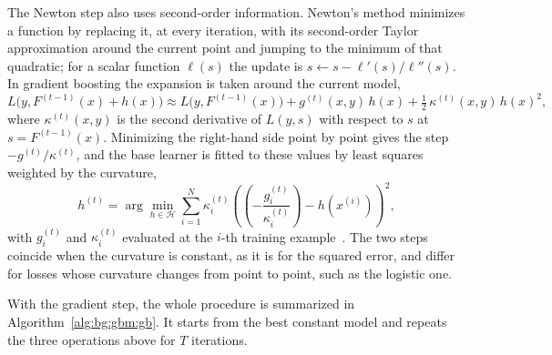     The Newton step also uses second-order information. Newton's method minimizes
    a function by replacing it, at every iteration, with its second-order Taylor
    approximation around the current point and jumping to the minimum of that
    quadratic; for a scalar function $\ell(s)$ the update is
    $s \leftarrow s - \ell'(s) / \ell''(s)$. In gradient boosting the expansion is
    taken around the current model,
    \begin{equation}
    L\bigl(y, F^{(t-1)}(x) + h(x)\bigr) \approx
    L\bigl(y, F^{(t-1)}(x)\bigr) + g^{(t)}(x, y)\, h(x)
    + \tfrac{1}{2}\, \kappa^{(t)}(x, y)\, h(x)^{2},
    \label{eq:bg:gbm:taylor}
    \end{equation}
    where $\kappa^{(t)}(x, y)$ is the second derivative of $L(y, s)$ with respect
    to $s$ at $s = F^{(t-1)}(x)$. Minimizing the right-hand side point by point
    gives the step $-g^{(t)} / \kappa^{(t)}$, and the base learner is fitted to
    these values by least squares weighted by the curvature,
    \begin{equation}
    h^{(t)} = \arg\min_{h \in \mathcal{H}}
    \sum_{i=1}^{N} \kappa_i^{(t)}
    \left( \left(-\frac{g_i^{(t)}}{\kappa_i^{(t)}}\right) - h(x^{(i)}) \right)^{2},
    \label{eq:bg:gbm:newton}
    \end{equation}
    with $g_i^{(t)}$ and $\kappa_i^{(t)}$ evaluated at the $i$-th training
    example~\cite{ibragimov2019}. The two steps coincide when the curvature is
    constant, as it is for the squared error, and differ for losses whose
    curvature changes from point to point, such as the logistic one.
    
    With the gradient step, the whole procedure is summarized in
    Algorithm~\ref{alg:bg:gbm:gb}. It starts from the best constant model and
    repeats the three operations above for $T$ iterations.
    

